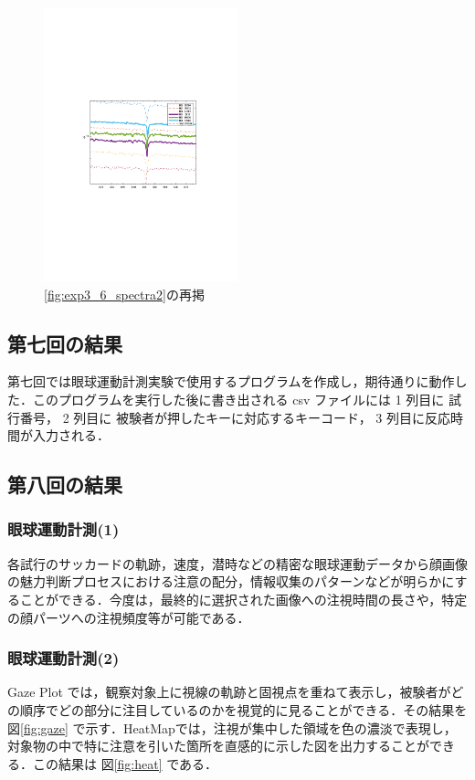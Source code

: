 \documentclass[dvipdfmx, titlepage, t]{jsarticle}
\begin{document}
        \begin{figure}[H]
        \centering
        \includegraphics[width=0.5\textwidth]{figure/stellar2.pdf}
        \caption{\ref{fig:exp3_6_spectra2}の再掲}
        \label{fig:six_ans}
    \end{figure}

    \subsection{第七回の結果}
    第七回では眼球運動計測実験で使用するプログラムを作成し，期待通りに動作した．このプログラムを実行した後に書き出される csv ファイルには 1 列目に 試行番号， 2 列目に 被験者が押したキーに対応するキーコード， 3 列目に反応時間が入力される．

    \subsection{第八回の結果}
    

    \subsubsection{眼球運動計測(1)}
        各試行のサッカードの軌跡，速度，潜時などの精密な眼球運動データから顔画像の魅力判断プロセスにおける注意の配分，情報収集のパターンなどが明らかにすることができる．今度は，最終的に選択された画像への注視時間の長さや，特定の顔パーツへの注視頻度等が可能である．

    \subsubsection{眼球運動計測(2)}
        Gaze Plot では，観察対象上に視線の軌跡と固視点を重ねて表示し，被験者がどの順序でどの部分に注目しているのかを視覚的に見ることができる．その結果を 図\ref{fig:gaze} で示す．HeatMapでは，注視が集中した領域を色の濃淡で表現し，対象物の中で特に注意を引いた箇所を直感的に示した図を出力することができる．この結果は 図\ref{fig:heat} である．
\end{document}
